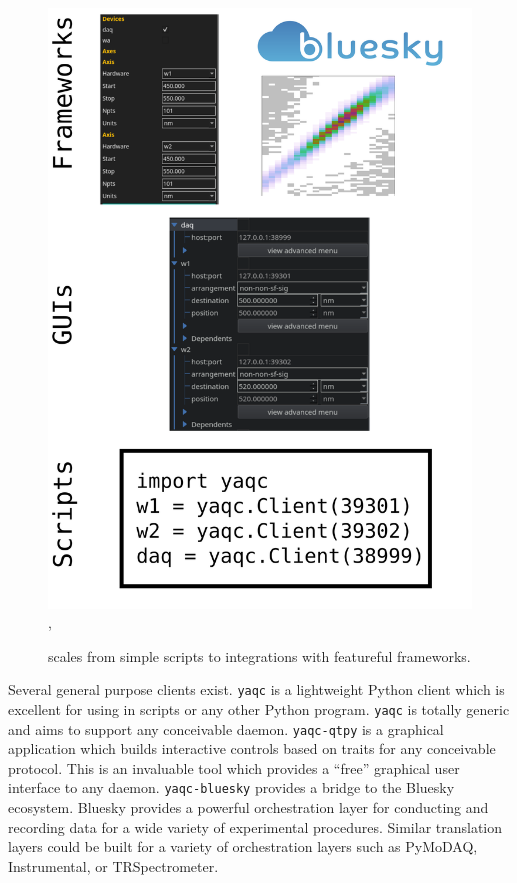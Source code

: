 \begin{figure}
\includegraphics[width=6in]{yaq/images/client_spectrum},
	\caption{  \label{yaq:fig:foundation} \yaq{} scales from simple scripts to integrations with featureful frameworks.}
\end{figure}



Several general purpose \yaq{} clients exist.
\texttt{yaqc}\cite{yaqc} is a lightweight Python client which is excellent for using in scripts or any other Python program.
\texttt{yaqc} is totally generic and aims to support any conceivable \yaq{} daemon.
\texttt{yaqc-qtpy}\cite{yaqc-qtpy} is a graphical application which builds interactive controls based on traits for any conceivable \yaq{} protocol.
This is an invaluable tool which provides a ``free'' graphical user interface to any daemon.
\texttt{yaqc-bluesky}\cite{yaqc-bluesky} provides a bridge to the Bluesky ecosystem\cite{AllanDanielB2019a}.
Bluesky provides a powerful orchestration layer for conducting and recording data for a wide variety of experimental procedures.
Similar translation layers could be built for a variety of orchestration layers such as PyMoDAQ\cite{WeberSebastien2021a}, Instrumental\cite{Bogdanowicz2022}, or TRSpectrometer\cite{trspectrometer}.

